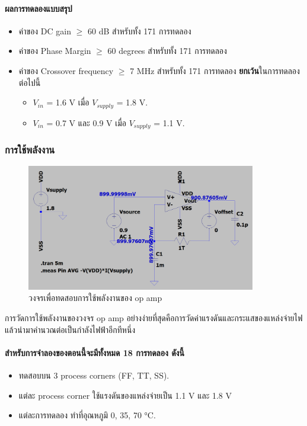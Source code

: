 \documentclass[a4paper, 11pt, oneside]{book} %
\begin{document}
\paragraph{ผลการทดลองแบบสรุป}

\begin{itemize}
    \item ค่าของ DC gain $\geq$ 60 dB สำหรับทั้ง 171 การทดลอง
    \item ค่าของ Phase Margin $\geq$ 60 degrees สำหรับทั้ง 171 การทดลอง
    \item ค่าของ Crossover frequency $\geq$ 7 MHz สำหรับทั้ง 171 การทดลอง \textbf{ยกเว้น}ในการทดลองต่อไปนี้
    \begin{itemize}
        \item $V_{in}$ = 1.6 V เมื่อ $V_{supply}$ = 1.8 V.
        \item $V_{in}$ = 0.7 V และ 0.9 V เมื่อ $V_{supply}$ = 1.1 V.
    \end{itemize}
\end{itemize}

\subsubsection{การใช้พลังงาน}

\begin{figure}[h]
    \centering
    \includegraphics[width = 10cm]{measure-power}
    \caption{วงจรเพื่อทดสอบการใช้พลังงานของ op amp}
    \label{measure-power}
\end{figure}

การวัดการใช้พลังงานของวงจร op amp อย่างง่ายที่สุดคือการวัดค่าแรงดันและกระแสของแหล่งจ่ายไฟ แล้วนำมาคำนวณต่อเป็นกำลังไฟฟ้าอีกทีหนึ่ง

\paragraph{สำหรับการจำลองของตอนนี้จะมีทั้งหมด 18 การทดลอง ดังนี้}

\begin{itemize}
    \item ทดสอบบน 3 process corners (FF, TT, SS).
    \item แต่ละ process corner ใช้แรงดันของแหล่งจ่ายเป็น 1.1 V และ 1.8 V
    \item แต่ละการทดลอง ทำที่อุณหภูมิ 0, 35, 70 \si{\degreeCelsius}.
\end{itemize}
\end{document}

